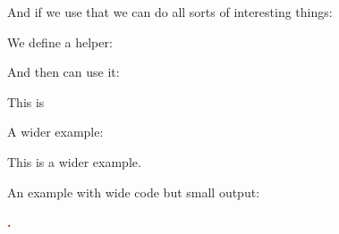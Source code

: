 And if we use that we can do all sorts of interesting things:
\begingroup
  \begin{ex2}[same-line=.45]
    We define a helper:
    \begin{ex}
      \newcommand\foo{bar}
    \end{ex}
    And then can use it:
    \begin{ex}[restore]
      This is \foo
    \end{ex}
    A wider example:
    \begin{ex}[below]
      This is a wider example.
    \end{ex}
    An example with wide code
    but small output:
    \begin{ex}[same-line=.9]
      \textcolor{red}{\bfseries.}
    \end{ex}
  \end{ex2}
\endgroup
